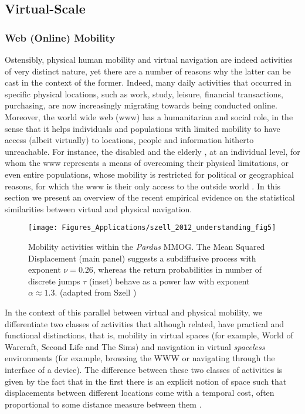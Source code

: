 \subsection{Virtual-Scale}

\subsubsection{Web (Online) Mobility}

Ostensibly, physical human mobility and virtual navigation are indeed activities of very distinct nature, yet there are a number of reasons why the latter can be cast in the context of the former. Indeed, many daily activities that occurred in specific physical locations, such as work, study, leisure, financial transactions, purchasing, are now increasingly migrating towards being conducted online. Moreover, the world wide web (www) has a humanitarian and social role, in the sense that it helps individuals and populations with limited mobility to have access (albeit virtually) to locations, people and information hitherto unreachable. For instance, the disabled \cite{harper_1999_towel,goble_2000_travails,ritchie_2003_promise} and  the elderly \cite{nimrod_2010_seniors,cotten_2013_impact,boxie_2007_using}, at an individual level, for whom the www represents a means of overcoming their physical limitations, or even entire populations, whose mobility is restricted for political or geographical reasons, for which the www is their only access to the outside world \cite{aouragh_2011_confined}. In this section we present an overview of the recent empirical evidence on the statistical similarities between virtual and physical navigation.



\begin{figure}[t!]
\centering
\texttt{[image: Figures\_Applications/szell\_2012\_understanding\_fig5]}
\caption{Mobility activities within the \emph{Pardus} MMOG. The Mean Squared Displacement (main panel) suggests a subdiffusive process with exponent $\nu=0.26$,  whereas the return probabilities in number of discrete jumps $\tau$ (inset) behave as a power law with exponent $\alpha \approx 1.3$. (adapted from Szell \et \cite{szell_2012_understanding}) }
\label{fig:szell2012understandingfig5}
\end{figure}



In the context of this parallel between virtual and physical mobility, we differentiate two classes of activities that although related, have practical and functional distinctions, that is, mobility in virtual spaces (for example, World of Warcraft, Second Life and The Sims)  and navigation  in virtual \emph{spaceless} environments (for example, browsing the WWW or navigating through the interface of a device). The difference between these two classes of activities is given by the fact that in the first there is an explicit notion of space such that  displacements between different locations come with a temporal cost, often proportional to some  distance measure between them \cite{shen_2013_human}. 


